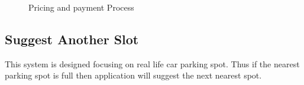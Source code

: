 \begin{figure}[H]
\centering
{} 
\hspace{1cm}
\caption{Pricing and payment Process}
\end{figure}

\subsection{Suggest Another Slot}
This system is designed focusing on real life car parking spot. Thus if the nearest parking spot is full then application will suggest the next nearest spot. 

